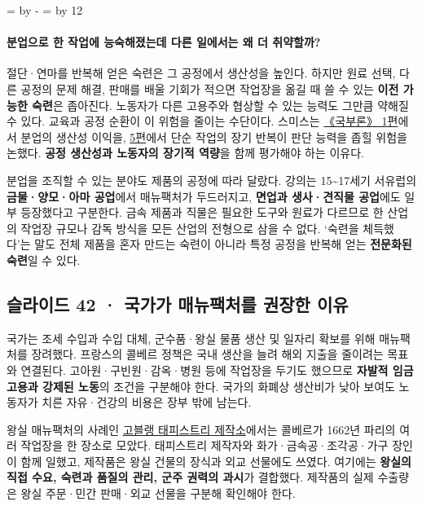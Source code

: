 \documentclass[10pt,a4paper]{article}
\newcommand{\ReserveQuestionSpace}{%
  \par\begingroup
  \dimen0=\pagegoal \advance\dimen0 by -\pagetotal
  \dimen2=\baselineskip \multiply\dimen2 by 12
  \ifdim\dimen0<\dimen2 \newpage\fi
  \endgroup}
\begin{document}
\ReserveQuestionSpace
\paragraph{분업으로 한 작업에 능숙해졌는데 다른 일에서는 왜 더 취약할까?}
절단·연마를 반복해 얻은 숙련은 그 공정에서 생산성을 높인다. 하지만 원료 선택, 다른 공정의 문제 해결, 판매를 배울 기회가 적으면 작업장을 옮길 때 쓸 수 있는 \textbf{이전 가능한 숙련}은 좁아진다. 노동자가 다른 고용주와 협상할 수 있는 능력도 그만큼 약해질 수 있다. 교육과 공정 순환이 이 위험을 줄이는 수단이다. 스미스는 \href{https://oll.libertyfund.org/titles/smith-an-inquiry-into-the-nature-and-causes-of-the-wealth-of-nations-cannan-ed-vol-1}{《국부론》 1편}에서 분업의 생산성 이익을, \href{https://oll.libertyfund.org/titles/smith-an-inquiry-into-the-nature-and-causes-of-the-wealth-of-nations-cannan-ed-vol-2}{5편}에서 단순 작업의 장기 반복이 판단 능력을 좁힐 위험을 논했다. \textbf{공정 생산성과 노동자의 장기적 역량}을 함께 평가해야 하는 이유다.\par

분업을 조직할 수 있는 분야도 제품의 공정에 따라 달랐다. 강의는 15\textasciitilde{}17세기 서유럽의 \textbf{금물·양모·아마 공업}에서 매뉴팩처가 두드러지고, \textbf{면업과 생사·견직물 공업}에도 일부 등장했다고 구분한다. 금속 제품과 직물은 필요한 도구와 원료가 다르므로 한 산업의 작업장 규모나 감독 방식을 모든 산업의 전형으로 삼을 수 없다. ‘숙련을 체득했다’는 말도 전체 제품을 혼자 만드는 숙련이 아니라 특정 공정을 반복해 얻는 \textbf{전문화된 숙련}일 수 있다.\par

\subsection{슬라이드 42 · 국가가 매뉴팩처를 권장한 이유}
국가는 조세 수입과 수입 대체, 군수품·왕실 물품 생산 및 일자리 확보를 위해 매뉴팩처를 장려했다. 프랑스의 콜베르 정책은 국내 생산을 늘려 해외 지출을 줄이려는 목표와 연결된다. 고아원·구빈원·감옥·병원 등에 작업장을 두기도 했으므로 \textbf{자발적 임금 고용과 강제된 노동}의 조건을 구분해야 한다. 국가의 화폐상 생산비가 낮아 보여도 노동자가 치른 자유·건강의 비용은 장부 밖에 남는다.\par

왕실 매뉴팩처의 사례인 \href{https://www.mobiliernational.culture.gouv.fr/fr/nous-connaitre/les-manufactures/manufacture-des-gobelins}{고블랭 태피스트리 제작소}에서는 콜베르가 1662년 파리의 여러 작업장을 한 장소로 모았다. 태피스트리 제작자와 화가·금속공·조각공·가구 장인이 함께 일했고, 제작품은 왕실 건물의 장식과 외교 선물에도 쓰였다. 여기에는 \textbf{왕실의 직접 수요, 숙련과 품질의 관리, 군주 권력의 과시}가 결합했다. 제작품의 실제 수출량은 왕실 주문·민간 판매·외교 선물을 구분해 확인해야 한다.\par
\end{document}
